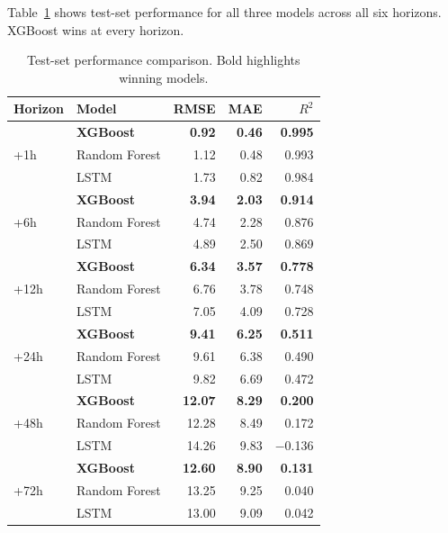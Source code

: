 \documentclass[12pt, a4paper]{article}
\begin{document}
Table~\ref{tab:results} shows test-set performance for all three models across all six horizons. XGBoost wins at every horizon.

\begin{table}[H]
\centering
\caption{Test-set performance comparison. Bold highlights winning models.}
\label{tab:results}
\small
\begin{tabular}{llrrr}
\toprule
\textbf{Horizon} & \textbf{Model} & \textbf{RMSE} & \textbf{MAE} & \textbf{$R^2$} \\
\midrule
\multirow{3}{*}{+1h}
  & \textbf{XGBoost}     & \textbf{0.92} & \textbf{0.46} & \textbf{0.995} \\
  & Random Forest        & 1.12          & 0.48          & 0.993 \\
  & LSTM                 & 1.73          & 0.82          & 0.984 \\
\midrule
\multirow{3}{*}{+6h}
  & \textbf{XGBoost}     & \textbf{3.94} & \textbf{2.03} & \textbf{0.914} \\
  & Random Forest        & 4.74          & 2.28          & 0.876 \\
  & LSTM                 & 4.89          & 2.50          & 0.869 \\
\midrule
\multirow{3}{*}{+12h}
  & \textbf{XGBoost}     & \textbf{6.34} & \textbf{3.57} & \textbf{0.778} \\
  & Random Forest        & 6.76          & 3.78          & 0.748 \\
  & LSTM                 & 7.05          & 4.09          & 0.728 \\
\midrule
\multirow{3}{*}{+24h}
  & \textbf{XGBoost}     & \textbf{9.41} & \textbf{6.25} & \textbf{0.511} \\
  & Random Forest        & 9.61          & 6.38          & 0.490 \\
  & LSTM                 & 9.82          & 6.69          & 0.472 \\
\midrule
\multirow{3}{*}{+48h}
  & \textbf{XGBoost}     & \textbf{12.07} & \textbf{8.29} & \textbf{0.200} \\
  & Random Forest        & 12.28          & 8.49          & 0.172 \\
  & LSTM                 & 14.26          & 9.83          & $-$0.136 \\
\midrule
\multirow{3}{*}{+72h}
  & \textbf{XGBoost}     & \textbf{12.60} & \textbf{8.90} & \textbf{0.131} \\
  & Random Forest        & 13.25          & 9.25          & 0.040 \\
  & LSTM                 & 13.00          & 9.09          & 0.042 \\
\bottomrule
\end{tabular}
\end{table}
\end{document}
